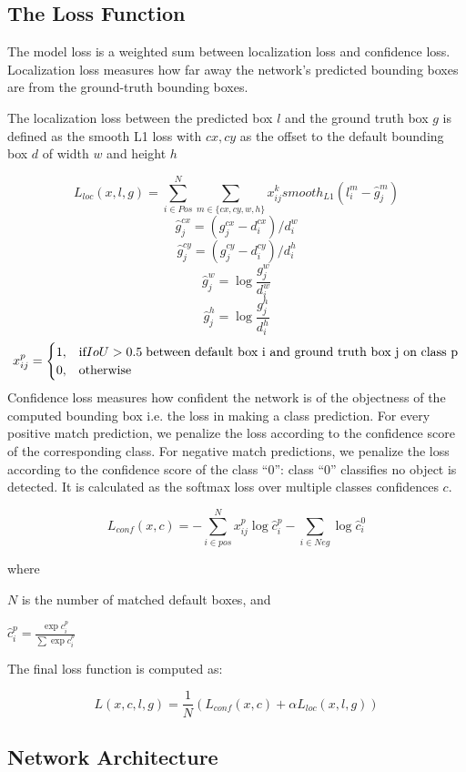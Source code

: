 \documentclass[12pt,letterpaper]{article}
\begin{document}
\subsection{The Loss Function}

The model loss is a weighted sum between localization loss and confidence loss. Localization loss measures how far away the network’s predicted bounding boxes are from the ground-truth bounding boxes.

The localization loss between the predicted box $l$ and the ground truth box $g$ is defined as the smooth L1 loss with $cx,cy$ as the offset to the default bounding box $d$ of width $w$ and height $h$

\[  L_{loc}(x,l,g) = \sum^{N}_{i \in Pos} \sum_{m \in \{cx,cy,w,h\}}x_{ij}^{k} smooth_{L1}(l_{i}^{m} - \widehat{g}_{j}^{m})    \]
\[\hat{g}_{j}^{cx}=(g_{j}^{cx}-d_{i}^{cx})/d_{i}^{w} \]
\[\hat{g}_{j}^{cy}=(g_{j}^{cy}-d_{i}^{cy})/d_{i}^{h}\]
\[ \hat{g}_{j}^{w} = \log{\frac{g_{j}^{w}}{d_{i}^{w}}} \]
\[\hat{g}_{j}^{h} = \log{\frac{g_{j}^{h}}{d_{i}^{h}}} \]
\[
    x_{ij}^{p} = 
    \begin{cases}
    1, & \text{if} IoU > 0.5 \; \textnormal{between default box i and ground truth box j on class p} \\
    0, & \text{otherwise}
    \end{cases}
    \]
Confidence loss measures how confident the network is of the objectness of the computed bounding box i.e. the loss in making a class prediction. For every positive match prediction, we penalize the loss according to the confidence score of the corresponding class. For negative match predictions, we penalize the loss according to the confidence score of the class “0”: class “0” classifies no object is detected. It is calculated as the softmax loss over multiple classes confidences $c$.

\[  L_{conf}(x,c) = -\sum_{i \in pos}^{N} x_{ij}^{p} \log{\hat{c}_{i}^{p}} - \sum_{i \in Neg}\log{\hat{c}_{i}^{0}}  \]

where

$N$ is the number of matched default boxes, and

$\hat{c}_{i}^{p} = \frac{\exp{c_{i}^{p}}}{\sum \exp{c_{i}^{p}}}$


The final loss function is computed as:

\[ L(x,c,l,g) = \frac{1}{N}(L_{conf}(x,c) + \alpha L_{loc}(x,l,g)) \]

\subsection{Network Architecture}
\end{document}
